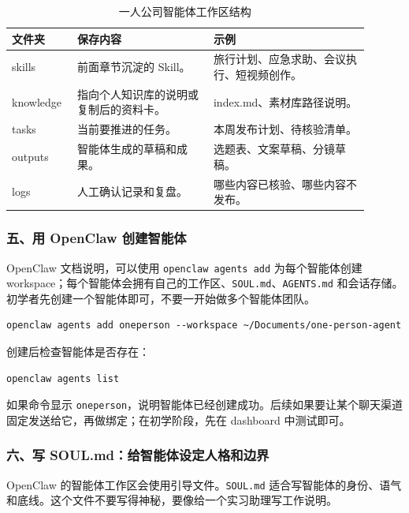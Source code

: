\begin{table}[H]
\centering
\caption{一人公司智能体工作区结构}
\label{tab:oneperson-workspace-structure}
\begin{tabular}{p{0.15\linewidth} p{0.35\linewidth} p{0.40\linewidth}}
\toprule
\textbf{文件夹} & \textbf{保存内容} & \textbf{示例} \\
\midrule
skills & 前面章节沉淀的 Skill。 & 旅行计划、应急求助、会议执行、短视频创作。 \\
knowledge & 指向个人知识库的说明或复制后的资料卡。 & index.md、素材库路径说明。 \\
tasks & 当前要推进的任务。 & 本周发布计划、待核验清单。 \\
outputs & 智能体生成的草稿和成果。 & 选题表、文案草稿、分镜草稿。 \\
logs & 人工确认记录和复盘。 & 哪些内容已核验、哪些内容不发布。 \\
\bottomrule
\end{tabular}
\end{table}

\subsubsection*{五、用 OpenClaw 创建智能体}

OpenClaw 文档说明，可以使用 \texttt{openclaw agents add} 为每个智能体创建 workspace；每个智能体会拥有自己的工作区、\texttt{SOUL.md}、\texttt{AGENTS.md} 和会话存储。初学者先创建一个智能体即可，不要一开始做多个智能体团队。

\begin{verbatim}
openclaw agents add oneperson --workspace ~/Documents/one-person-agent
\end{verbatim}

创建后检查智能体是否存在：
\begin{verbatim}
openclaw agents list
\end{verbatim}

如果命令显示 \texttt{oneperson}，说明智能体已经创建成功。后续如果要让某个聊天渠道固定发送给它，再做绑定；在初学阶段，先在 dashboard 中测试即可。

\subsubsection*{六、写 SOUL.md：给智能体设定人格和边界}

OpenClaw 的智能体工作区会使用引导文件。\texttt{SOUL.md} 适合写智能体的身份、语气和底线。这个文件不要写得神秘，要像给一个实习助理写工作说明。

